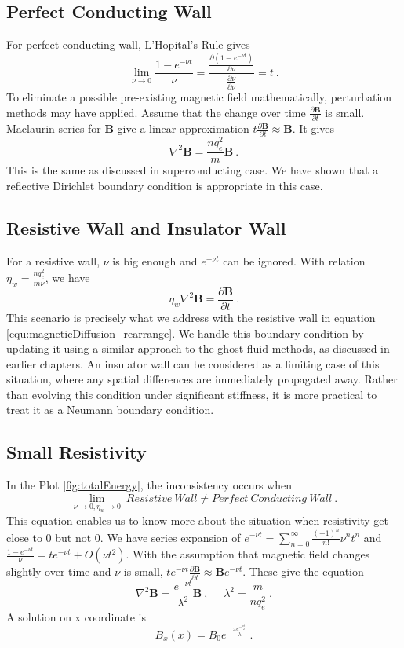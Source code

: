 \subsection*{Perfect Conducting Wall}
For perfect conducting wall, L'Hopital's Rule gives $$
\lim_{\nu \to 0}\frac{1-e^{-\nu t}}{\nu}=\frac{\frac{\partial(1-e^{-\nu t})}{\partial \nu}}{\frac{\partial\nu}{\partial \nu}}=t\ .
$$ 
To eliminate a possible pre-existing magnetic field mathematically, perturbation methods may have applied. Assume that the change over time $\frac{\partial \mathbf{B}}{\partial t}$ is small. Maclaurin series for $\mathbf{B}$ give a linear approximation $t\frac{\partial \mathbf{B}}{\partial t}\approx\mathbf{B}$. It gives 
$$
\nabla^2\mathbf{B}=\frac{n q_e^2}{m}\mathbf{B}\ .
$$
This is the same as discussed in superconducting case. We have shown that a reflective Dirichlet boundary condition is appropriate in this case.

\subsection*{Resistive Wall and Insulator Wall}
For a resistive wall, $\nu$ is big enough and $e^{-\nu t}$ can be ignored. With relation $\eta_w=\frac{nq_e^2}{m\nu}$, we have 
$$
\eta_{w}\nabla^2\mathbf{B}=\frac{\partial \mathbf{B}}{\partial t}\ .
$$
This scenario is precisely what we address with the resistive wall in equation \ref{equ:magneticDiffusion_rearrange}. We handle this boundary condition by updating it using a similar approach to the ghost fluid methods, as discussed in earlier chapters. An insulator wall can be considered as a limiting case of this situation, where any spatial differences are immediately propagated away. Rather than evolving this condition under significant stiffness, it is more practical to treat it as a Neumann boundary condition.

\subsection*{Small Resistivity}
In the Plot \ref{fig:totalEnergy}, the inconsistency occurs when 
$$
\lim_{\nu \to 0,\eta_w \to 0}\ Resistive\ Wall \neq Perfect\ Conducting\ Wall\ .
$$
This equation enables us to know more about the situation when resistivity get close to 0 but not 0. We have series expansion of $e^{-\nu t}=\sum_{n=0}^{\infty}\frac{(-1)^n}{n!}\nu^nt^n$ and $\frac{1 - e^{-\nu t}}{\nu} = t e^{-\nu t} + O(\nu t^2)$. With the assumption that magnetic field changes slightly over time and $\nu$ is small, $te^{-\nu t}\frac{\partial \mathbf{B}}{\partial t}\approx\mathbf{B}e^{-\nu t}$. These give the equation 
\begin{equation*}
	\nabla^2\mathbf{B}=\frac{e^{-\nu t}}{\lambda^2}\mathbf{B}\ ,\ \ \ \ \ \  \lambda^2=\frac{m}{n q_e^2}\ .
\end{equation*}
A solution on x coordinate is
\begin{equation}
	B_x(x)=B_0e^{-\frac{xe^{-\frac{\nu t}{2}}}{\lambda}}\ .
\end{equation}

